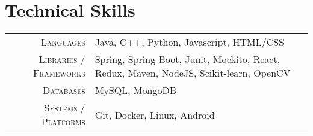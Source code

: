 \documentclass[a4paper,10pt]{extarticle} %
\begin{document}

\vspace{0.1cm}
\section{\textcolor{primary}{Technical Skills}}

\begin{tabular}{r|p{15cm}}
\textsc{Languages} & Java, C++, Python, Javascript, HTML/CSS\\
\textsc{Libraries / Frameworks} & Spring, Spring Boot, Junit, Mockito, React, Redux, Maven, NodeJS, Scikit-learn, OpenCV\\
\textsc{Databases} & MySQL, MongoDB\\
\textsc{Systems / Platforms} & Git, Docker, Linux, Android\\
\end{tabular}


\end{document}
